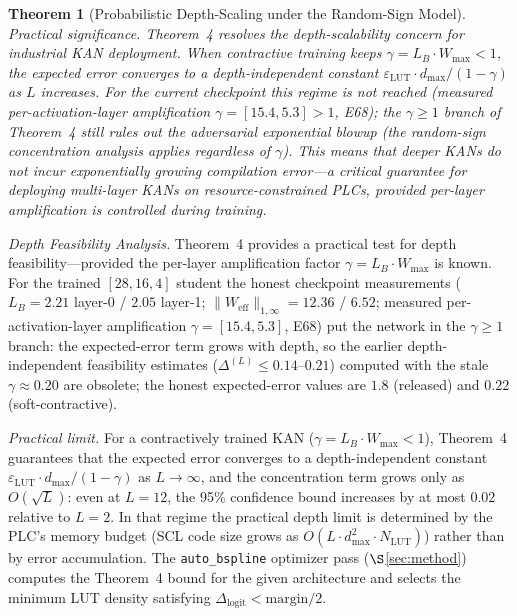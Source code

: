 \documentclass[journal,onecolumn]{IEEEtran}
\newtheorem{theorem}{Theorem}
\begin{document}
\begin{theorem}[Probabilistic Depth-Scaling under the Random-Sign Model]
\vspace{4pt}
\noindent\textit{Practical significance.}
Theorem~4 resolves the depth-scalability concern for industrial KAN
deployment. When contractive training keeps $\gamma = L_B \cdot W_{\max}
< 1$, the expected error converges to a depth-independent constant
$\varepsilon_{\text{LUT}} \cdot d_{\max} / (1-\gamma)$ as $L$ increases.
For the current checkpoint this regime is \emph{not} reached (measured
per-activation-layer amplification $\gamma = [15.4, 5.3] > 1$, E68);
the $\gamma \geq 1$ branch of Theorem~4 still rules out the adversarial
exponential blowup (the random-sign concentration analysis applies
regardless of $\gamma$). This means that \textit{deeper KANs
do not incur exponentially growing compilation error}---a critical
guarantee for deploying multi-layer KANs on resource-constrained PLCs,
provided per-layer amplification is controlled during training.

\end{theorem}

\noindent\textit{Depth Feasibility Analysis.}
Theorem~4 provides a practical test for depth feasibility---provided the
per-layer amplification factor $\gamma = L_B \cdot W_{\max}$ is known.
For the trained $[28,16,4]$ student the honest checkpoint measurements
($L_B = 2.21$ layer-0 / $2.05$ layer-1;
$\|W_{\text{eff}}\|_{1,\infty} = 12.36$ / $6.52$; measured
per-activation-layer amplification $\gamma = [15.4, 5.3]$, E68) put the
network in the $\gamma \geq 1$ branch: the expected-error term grows
with depth, so the earlier depth-independent feasibility estimates
($\Delta^{(L)} \leq 0.14$--$0.21$) computed with the stale
$\gamma \approx 0.20$ are obsolete; the honest expected-error values are
$1.8$ (released) and $0.22$ (soft-contractive).

\textit{Practical limit.} For a contractively trained KAN
($\gamma = L_B \cdot W_{\max} < 1$), Theorem~4
guarantees that the expected error converges to a depth-independent constant
$\varepsilon_{\text{LUT}} \cdot d_{\max} / (1 - \gamma)$ as $L \to \infty$,
and the concentration term grows only as $O(\sqrt{L})$: even at $L = 12$,
the 95\% confidence bound increases by at most $0.02$ relative to $L = 2$.
In that regime the practical depth limit is determined by the PLC's memory budget
(SCL code size grows as $O(L \cdot d_{\max}^2 \cdot N_{\text{LUT}})$) rather
than by error accumulation. The \texttt{auto\_bspline} optimizer pass
($\S$\ref{sec:method}) computes the Theorem~4 bound for the given architecture
and selects the minimum LUT density satisfying $\Delta_{\text{logit}} <
\text{margin}/2$.
\end{document}
